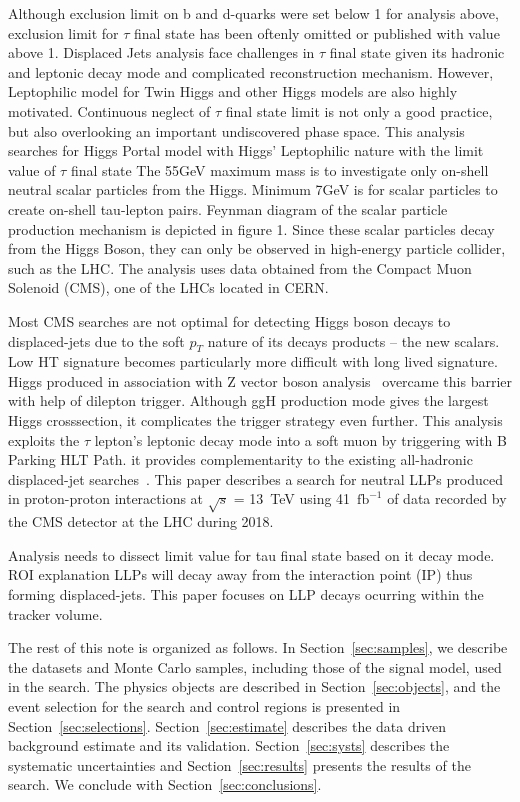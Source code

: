 Although exclusion limit on b and d-quarks were set below 1 for analysis above, exclusion limit for $\tau$ final state has been oftenly omitted or published with value above 1.  
Displaced Jets analysis face challenges in $\tau$ final state given its hadronic and leptonic decay mode and complicated reconstruction mechanism. 
However, Leptophilic model for Twin Higgs and other Higgs models are also highly motivated. Continuous neglect of $\tau$ final state limit is not only a good practice, but also overlooking an important undiscovered phase space. This analysis searches for Higgs Portal model with Higgs' Leptophilic nature with the limit value of $\tau$ final state
The 55GeV maximum mass is to investigate only on-shell neutral scalar particles from the Higgs. 
Minimum 7GeV is for scalar particles to create on-shell tau-lepton pairs.
Feynman diagram of the scalar particle production mechanism is depicted in figure 1.
Since these scalar particles decay from the Higgs Boson, they can only be observed in high-energy particle collider, such as the LHC. 
The analysis uses data obtained from the Compact Muon Solenoid (CMS), one of the LHCs located in CERN. 

Most CMS searches are not optimal for detecting Higgs boson decays to displaced-jets
due to the soft $p_T$ nature of its decays products -- the new scalars.
Low HT signature becomes particularly more difficult with long lived signature.
Higgs produced in association with Z vector boson analysis~\cite{ZHAN} overcame this barrier with help of dilepton trigger. 
Although ggH production mode gives the largest Higgs crosssection, it complicates the trigger strategy even further. 
This analysis exploits the $\tau$ lepton's leptonic decay mode into a soft muon by triggering with B Parking HLT Path.
it provides complementarity to the existing all-hadronic displaced-jet
 searches~\cite{displacedjets1,displacedjets2,displacedjets3}.
This paper describes a search for neutral LLPs produced in proton-proton interactions at
$\sqrt{s}$ = 13~TeV using 41~$\mathrm{fb}^{-1}$ of data recorded by the CMS detector at the LHC
during 2018. 


Analysis needs to dissect limit value for tau final state based on it decay mode.
ROI explanation
LLPs will decay away from the interaction point (IP) thus forming displaced-jets.
This paper focuses on LLP decays ocurring within the tracker volume.


The rest of this note is organized as follows.
In Section~\ref{sec:samples}, we describe the datasets and Monte Carlo samples, including those of the signal model,
used in the search. The physics objects are described in Section~\ref{sec:objects},
and the event selection for the search and control regions is presented in
Section~\ref{sec:selections}. Section~\ref{sec:estimate} describes the data driven
background estimate and its validation. Section~\ref{sec:systs} describes the systematic uncertainties
 and Section~\ref{sec:results} presents the results of the search.
We conclude with Section~\ref{sec:conclusions}.
